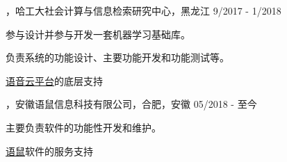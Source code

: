 
\begin{cventries}

\cvexperience
{，哈工大社会计算与信息检索研究中心，黑龙江}
{9/2017 - 1/2018}
{
    \begin{cvitems}
    \item {参与设计并参与开发一套机器学习基础库。}
    \item {负责系统的功能设计、主要功能开发和功能测试等。}
    \item {\href{https://www.ltp-cloud.com/}{语音云平台}的底层支持}
    \end{cvitems}
}

\cvexperience
{，安徽语鼠信息科技有限公司，合肥，安徽}
{05/2018 - 至今}
{
    \begin{cvitems}
    \item {主要负责软件的功能性开发和维护。}
    \item {\href{http://www.vipyushu.com}{语鼠}软件的服务支持 }
    \end{cvitems}
}

\end{cventries}